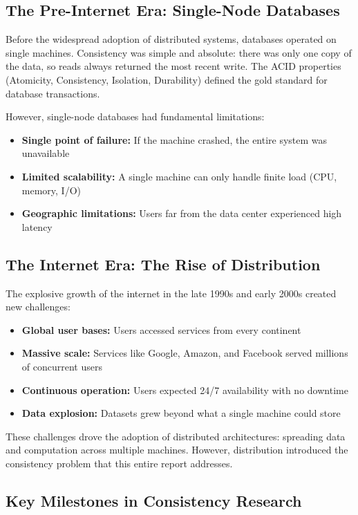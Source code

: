 \documentclass[10pt,a4paper]{article}
\begin{document}
\subsection{The Pre-Internet Era: Single-Node Databases}

Before the widespread adoption of distributed systems, databases operated on single machines. Consistency was simple and absolute: there was only one copy of the data, so reads always returned the most recent write. The ACID properties (Atomicity, Consistency, Isolation, Durability) defined the gold standard for database transactions.

However, single-node databases had fundamental limitations:
\begin{itemize}
    \item \textbf{Single point of failure:} If the machine crashed, the entire system was unavailable
    \item \textbf{Limited scalability:} A single machine can only handle finite load (CPU, memory, I/O)
    \item \textbf{Geographic limitations:} Users far from the data center experienced high latency
\end{itemize}

\subsection{The Internet Era: The Rise of Distribution}

The explosive growth of the internet in the late 1990s and early 2000s created new challenges:
\begin{itemize}
    \item \textbf{Global user bases:} Users accessed services from every continent
    \item \textbf{Massive scale:} Services like Google, Amazon, and Facebook served millions of concurrent users
    \item \textbf{Continuous operation:} Users expected 24/7 availability with no downtime
    \item \textbf{Data explosion:} Datasets grew beyond what a single machine could store
\end{itemize}

These challenges drove the adoption of distributed architectures: spreading data and computation across multiple machines. However, distribution introduced the consistency problem that this entire report addresses.

\subsection{Key Milestones in Consistency Research}
\end{document}
